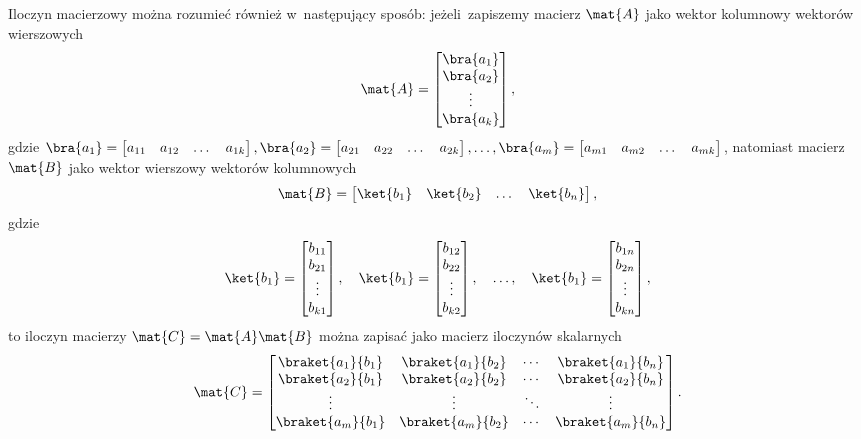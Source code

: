 Iloczyn macierzowy można rozumieć również w~następujący sposób: jeżeli~zapiszemy
macierz $\mat{A}$ jako wektor kolumnowy wektorów wierszowych
$$
	\mat{A} = \begin{bmatrix}
		\bra{a_1} \\
		\bra{a_2} \\
		\vdots    \\
		\bra{a_k}
	\end{bmatrix},
$$
gdzie $\bra{a_1} = \begin{bmatrix}a_{11} & a_{12} & \dots & a_{1k} \end{bmatrix},
	\bra{a_2} = \begin{bmatrix}a_{21} & a_{22} & \dots & a_{2k} \end{bmatrix}, \dots,
	\bra{a_m} = \begin{bmatrix}a_{m1} & a_{m2} & \dots & a_{mk} \end{bmatrix}$,
natomiast macierz $\mat{B}$ jako wektor wierszowy wektorów kolumnowych
$$
	\mat{B} = \begin{bmatrix}
		\ket{b_1} &
		\ket{b_2} &
		\dots     &
		\ket{b_n}
	\end{bmatrix},
$$
gdzie
$$
	\ket{b_1} =
	\begin{bmatrix}
		b_{11} \\
		b_{21} \\
		\vdots \\
		b_{k1}
	\end{bmatrix}, \quad
	\ket{b_1} =
	\begin{bmatrix}
		b_{12} \\
		b_{22} \\
		\vdots \\
		b_{k2}\end{bmatrix},\quad \dots, \quad
	\ket{b_1} =
	\begin{bmatrix}
		b_{1n} \\
		b_{2n} \\
		\vdots \\
		b_{kn}
	\end{bmatrix},
$$
to iloczyn macierzy $\mat{C}=\mat{A}\mat{B}$ można zapisać jako macierz iloczynów skalarnych
$$
	\mat{C}=
	\begin{bmatrix}
		\braket{a_1}{b_1} & \braket{a_1}{b_2} & \cdots & \braket{a_1}{b_n} \\
		\braket{a_2}{b_1} & \braket{a_2}{b_2} & \cdots & \braket{a_2}{b_n} \\
		\vdots            & \vdots            & \ddots & \vdots            \\
		\braket{a_m}{b_1} & \braket{a_m}{b_2} & \cdots & \braket{a_m}{b_n} \\
	\end{bmatrix}.
$$
